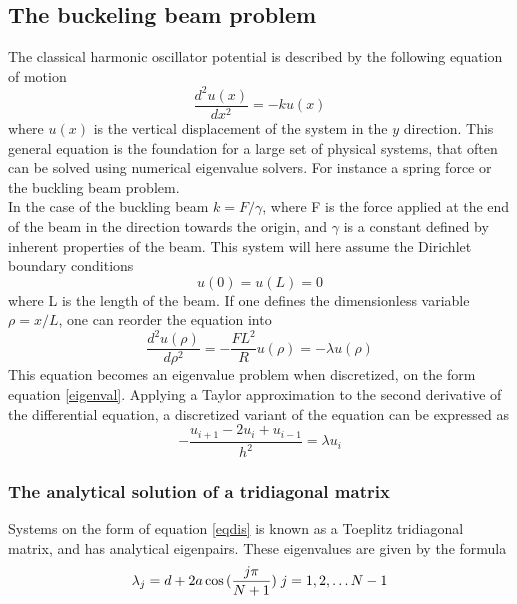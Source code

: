 \documentclass[%
reprint,
amsmath,amssymb,
aps,
]{revtex4-1}
\begin{document}
\subsection{The buckeling beam problem} \noindent 
The classical harmonic oscillator potential is described by the following equation of motion
\begin{equation}\label{evp}
\frac{d^2 u(x)}{dx^2} = -k u(x)
\end{equation}
where $u(x)$ is the vertical displacement of the system in the $y$ direction. This general equation is the foundation for a large set of physical systems, that often can be solved using numerical eigenvalue solvers. For instance a spring force or the buckling beam problem. \\ \indent 
 In the case of the buckling beam $k = F/\gamma$, where F is the force applied at the end of the beam in the direction towards the origin, and $\gamma$ is a constant defined by inherent properties of the beam. This system will here assume the Dirichlet boundary conditions
 \begin{equation*}
 	u(0) = u(L) = 0
 \end{equation*}
where L is the length of the beam. If one defines the dimensionless variable $\rho = x/L$, one can reorder the equation into
\begin{equation}\label{bb}
\frac{d^2 u(\rho)}{d\rho^2} = -\frac{FL^2}{R} u(\rho)=-\lambda u(\rho)
\end{equation}
This equation becomes an eigenvalue problem when discretized, on the form equation \ref{eigenval}. Applying a Taylor approximation to the second derivative of the differential equation, a discretized variant of the equation can be expressed as
\begin{equation}\label{eqdis}
-\frac{u_{i+1} -2u_i +u_{i-1} }{h^2}  = \lambda u_i
\end{equation}


\subsubsection{The analytical solution of a tridiagonal matrix} \noindent 
Systems on the form of equation \ref{eqdis} is known as a Toeplitz tridiagonal matrix, and has analytical eigenpairs. These eigenvalues are given by the formula
\begin{equation}\label{analytical}
\lambda_j = d+2a\cos{(\frac{j\pi}{N+1})} \hspace{0.1cm} j=1,2,\dots N-1
\end{equation}
\end{document}
